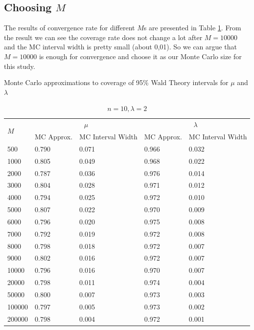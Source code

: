 \documentclass{article}
\begin{document}
	\subsection{Choosing $M$}
	The results of convergence rate for different $M$s are presented in Table \ref{chooseM}. From the result we can see the coverage rate does not change a lot after $M = 10000$ and the MC interval width is pretty small (about 0,01). So we can argue that $M = 10000$ is enough for convergence and choose it as our Monte Carlo size for this study.  
	\begin{table}[!htb]
	\small
		\centering
		\caption{Monte Carlo approximations to coverage of 95\% Wald Theory intervals for $\mu$ and $\lambda$}
		\label{chooseM}
		\begin{subtable}[b]{\textwidth}
		\centering
		\begin{tabular}{l|ll|ll}
		\toprule
        \multirow{2}{*}{$M$} & \multicolumn{2}{c|}{$\mu$}      & \multicolumn{2}{c}{$\lambda$}  \\ 
                           & MC Approx. & MC Interval Width & MC Approx. & MC Interval Width \\
                           \midrule
       500   &0.790 &0.071 &0.966 &0.032\\
       1000  &0.805 &0.049 &0.968 &0.022\\
       2000  &0.787 &0.036 &0.976 &0.014\\
       3000  &0.804 &0.028 &0.971 &0.012\\
       4000  &0.794 &0.025 &0.972 &0.010\\
       5000  &0.807 &0.022 &0.970 &0.009\\
       6000  &0.796 &0.020 &0.975 &0.008\\
       7000  &0.792 &0.019 &0.972 &0.008\\
       8000  &0.798 &0.018 &0.972 &0.007\\
       9000  &0.802 &0.016 &0.972 &0.007\\
       10000 &0.796 &0.016 &0.970 &0.007\\
       20000 &0.798 &0.011 &0.974 &0.004\\
       50000 &0.800 &0.007 &0.973 &0.003\\
       100000&0.797 &0.005 &0.973 &0.002\\
       200000&0.798 &0.004 &0.972 &0.001\\
       \bottomrule
       \end{tabular}
       \caption{$n = 10, \lambda = 2$}
       \end{subtable}%


\end{table}
\end{document}
